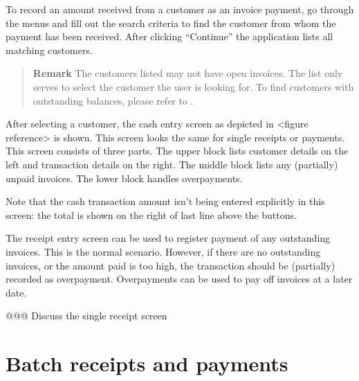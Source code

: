 To record an amount received from a customer as an invoice payment, go through the menus
 and fill out the search criteria to find the customer from whom
the payment has been received. After clicking ``Continue'' the application lists all matching
customers.

\begin{quotation}
\textbf{Remark} The customers listed may not have open invoices. The list only serves to select
the customer the user is looking for. To find customers with outstanding balances, please refer to
.
\end{quotation}

After selecting a customer, the cash entry screen as depicted in <figure reference> is shown. This
screen looks the same for single receipts or payments. This screen consists of three parts. The upper
block lists customer details on the left and transaction details on the right. The middle block lists
any (partially) unpaid invoices. The lower block handles overpayments.

Note that the cash transaction amount isn't being entered explicitly in this screen: the total
is shown on the right of last line above the buttons.

The receipt entry screen can be used to register payment of any outstanding invoices. This is the
normal scenario. However, if there are no outstanding invoices, or the amount paid is too high,
the transaction should be (partially) recorded as overpayment. Overpayments can be used to
pay off invoices at a later date.


@@@ Discuss the single receipt screen



\section{Batch receipts and payments}


